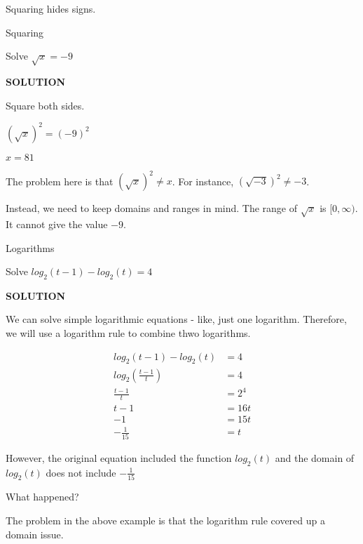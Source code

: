 \documentclass{ximera}
\begin{document}
Squaring hides signs.


\begin{example} Squaring


Solve $\sqrt{x} = -9$

\textbf{\textcolor{purple!50!blue!90!black}{SOLUTION}}

Square both sides.


$(\sqrt{x})^2 = (-9)^2$

$x = 81$



The problem here is that  $(\sqrt{x})^2 \ne x$.  For instance, $(\sqrt{-3})^2 \ne -3$.


Instead, we need to keep domains and ranges in mind.  The range of $\sqrt{x}$ is $[0, \infty)$. It cannot give the value $-9$.



\end{example}









\begin{example} Logarithms


Solve $log_2(t-1) - log_2(t) = 4$

\textbf{\textcolor{purple!50!blue!90!black}{SOLUTION}}


We can solve simple logarithmic equations - like, just one logarithm.  Therefore, we will use a logarithm rule to combine thwo logarithms.




\begin{align*}
log_2(t-1) - log_2(t) & = 4   \\
log_2 \left( \frac{t-1}{t} \right)  & = 4  \\
\frac{t-1}{t} & = 2^4  \\
 t-1 & = 16t  \\
-1 & = 15t  \\
-\frac{1}{15} & = t
\end{align*}



However, the original equation included the function $log_2(t)$ and the domain of $log_2(t)$ does not include $-\frac{1}{15}$




\end{example}


What happened?


The problem in the above example is that the logarithm rule covered up a domain issue.
\end{document}
